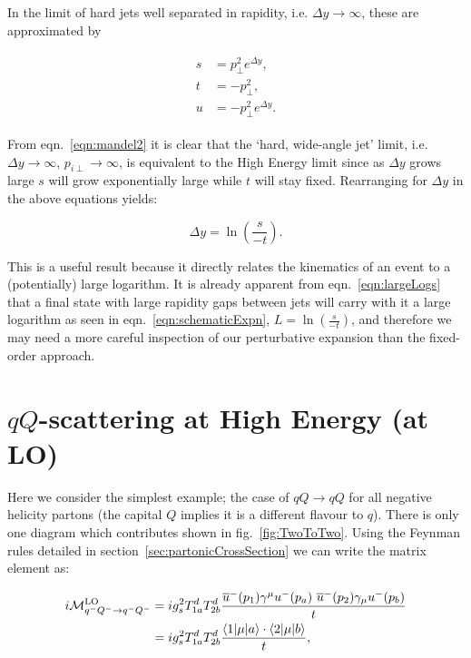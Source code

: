 	In the limit of hard jets well separated in rapidity, i.e. $\Delta y\rightarrow\infty$,
	these are approximated by

	\begin{align}
	\begin{split}
		s &= p_\perp^2 e^{\Delta y},\\
		t &= -p_\perp^2,\\
		u &= -p_\perp^2 e^{\Delta y}.
		\label{eqn:mandel2}
	\end{split}
	\end{align}

	From  eqn.~\eqref{eqn:mandel2} it is clear that the `hard, wide-angle jet' limit, i.e. $\Delta y\to\infty$,
	$p_{i\perp}\to\infty$, is equivalent to the High Energy limit since as $\Delta y$ grows large $s$ will
	grow exponentially large while $t$ will stay fixed.  Rearranging for $\Delta y$ in the above equations yields:

	\begin{equation}
		\Delta y = \ln \left(\frac{s}{-t}\right).
		\label{eqn:largeLogs}
	\end{equation}

	This is a useful result because it directly relates the kinematics of an event to a (potentially)
	large logarithm.  It is already apparent from eqn.~\eqref{eqn:largeLogs} that a final state
	with large rapidity gaps between jets will carry with it a large logarithm as seen in
	eqn.~\eqref{eqn:schematicExpn}, $L=\ln \left(\frac{s}{-t}\right)$, and therefore we may need a
	more careful inspection of our perturbative expansion than the fixed-order approach.

\section{$qQ$-scattering at High Energy (at LO)}
	\label{sec:qQScat}

	Here we consider the simplest example; the case of $qQ\rightarrow qQ$ for all negative helicity partons
	(the capital $Q$ implies it is a different flavour to $q$).  There is only one diagram which contributes shown
	in fig.~\eqref{fig:TwoToTwo}.  Using the Feynman rules detailed in section~\ref{sec:partonicCrossSection} we can
	write the matrix element as:

	\begin{align}
		i\mathcal{M}_{q^-Q^-\rightarrow q^-Q^-}^{\text{LO}} &= ig_s^2T^d_{1a}T^d_{2b}
		\frac{\overline{u}^-(p_1)\gamma^\mu
		  u^-(p_a)\text{ }\overline{u}^-(p_2)\gamma_\mu u^-(p_b)}{t}\\
		  &= ig_s^2T^d_{1a}T^d_{2b}\frac{\langle 1 | \mu | a \rangle\cdot\langle 2 | \mu | b \rangle}{t},
		  \label{eqn:similarBrackets}
	\end{align}

